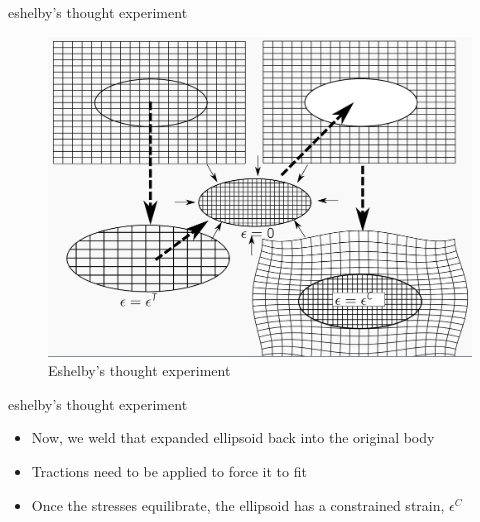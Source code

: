 \documentclass[
  letterpaper,
  ignorenonframetext,
  aspectratio=43,
  handout,
  12pt]{beamer}
\providecommand{\tightlist}{%
  \setlength{\itemsep}{0pt}\setlength{\parskip}{0pt}}
\providecommand{\tightlist}{%
\setlength{\itemsep}{0pt}\setlength{\parskip}{0pt}}
\let\Oldincludegraphics\includegraphics
\renewcommand{\includegraphics}[2][]{\Oldincludegraphics[width=\textwidth,height=0.7\textheight,keepaspectratio]{#2}}
\begin{document}
\begin{frame}{eshelby's thought experiment}
\protect\hypertarget{eshelbys-thought-experiment-1}{}
\begin{figure}
\centering
\includegraphics{../images/eshelby.png}
\caption{Eshelby's thought experiment}
\end{figure}
\end{frame}

\begin{frame}{eshelby's thought experiment}
\protect\hypertarget{eshelbys-thought-experiment-2}{}
\begin{itemize}
\tightlist
\item
  Now, we weld that expanded ellipsoid back into the original body
\item
  Tractions need to be applied to force it to fit
\item
  Once the stresses equilibrate, the ellipsoid has a constrained strain,
  \(\epsilon^C\)
\end{itemize}
\end{frame}
\end{document}
